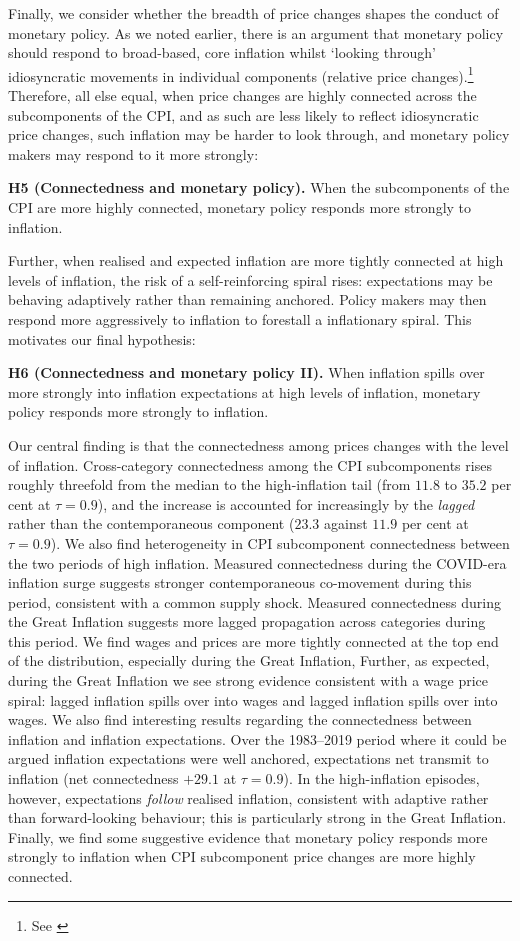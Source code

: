 \documentclass{article}
\begin{document}
Finally, we consider whether the breadth of price changes shapes the conduct of
monetary policy. As we noted earlier, there is an argument that monetary policy should
respond to broad-based, core inflation whilst `looking through' idiosyncratic
movements in individual components (relative price changes).\footnote{ See  \cite[p.276]{goodfriend1997new}} Therefore, all else equal, when price changes are highly
connected across the subcomponents of the CPI, and as such are less likely to reflect idiosyncratic price changes, such
inflation may be harder to look through, and monetary policy makers may respond to it
more strongly:

\noindent\textbf{H5 (Connectedness and monetary policy).} When the subcomponents of the
CPI are more highly connected, monetary policy responds more strongly to inflation.

Further, when realised and expected inflation are more tightly connected at high levels of inflation, the
risk of a self-reinforcing spiral rises: expectations may be behaving adaptively
rather than remaining anchored. Policy makers may then respond more aggressively to inflation
to forestall a inflationary spiral. This motivates our final hypothesis:
 

\noindent\textbf{H6 (Connectedness and monetary policy II).} When inflation spills over
more strongly into inflation expectations at high levels of inflation, monetary policy responds more strongly to
inflation.


Our central finding is that the connectedness among prices changes with the
level of inflation. Cross-category connectedness among the CPI subcomponents rises
roughly threefold from the median to the high-inflation tail (from $11.8$ to $35.2$
per cent at $\tau=0.9$), and the increase is accounted for increasingly by the
\emph{lagged} rather than the contemporaneous component ($23.3$ against $11.9$ per
cent at $\tau=0.9$). We also find heterogeneity in  CPI subcomponent connectedness between the two periods of high inflation. Measured connectedness during the COVID-era inflation surge suggests stronger contemporaneous co-movement during this period, consistent with a common supply shock. Measured connectedness during the Great Inflation suggests more lagged propagation across categories during this period. We find wages and prices are more tightly connected at the top end of the distribution, especially during the Great Inflation,  Further, as expected, during the Great Inflation we see strong evidence consistent with a wage price spiral: lagged inflation spills over into wages and lagged inflation spills over into wages. We also find interesting results regarding the connectedness between inflation and inflation expectations.  Over the 1983--2019 period where it could be argued inflation expectations were well anchored, expectations net transmit to inflation (net
connectedness $+29.1$ at $\tau=0.9$). In the high-inflation episodes, however, expectations \emph{follow}
realised inflation, consistent with adaptive rather than forward-looking behaviour; this is particularly strong in the Great Inflation. Finally, we find some suggestive evidence that monetary policy responds more strongly to
inflation when CPI subcomponent price changes are more highly connected.  
\end{document}
